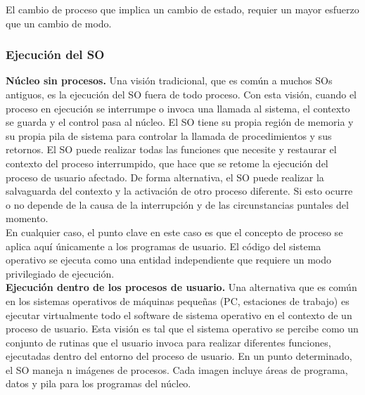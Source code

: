 \documentclass{article}
\begin{document}
				El cambio de proceso que implica un cambio de estado, requier un mayor esfuerzo que un cambio de modo.
				
			\subsubsection{Ejecución del SO}
				\textbf{Núcleo sin procesos.} Una visión tradicional, que es común a muchos SOs antiguos, es la ejecución del SO fuera de todo proceso. Con esta visión, cuando el proceso en ejecución se interrumpe o invoca una llamada al sistema, el contexto se guarda y el control pasa al núcleo. El SO tiene su propia región de memoria y su propia pila de sistema para controlar la llamada de procedimientos y sus retornos. El SO puede realizar todas las funciones que necesite y restaurar el contexto del proceso interrumpido, que hace que se retome la ejecución del proceso de usuario afectado. De forma alternativa, el SO puede realizar la salvaguarda del contexto y la activación de otro proceso diferente. Si esto ocurre o no depende de la causa de la interrupción y de las circunstancias puntales del momento. \\
				
				En cualquier caso, el punto clave en este caso es que el concepto de proceso se aplica aquí únicamente a los programas de usuario. El código del sistema operativo se ejecuta como una entidad independiente que requiere un modo privilegiado de ejecución. \\
				
				\textbf{Ejecución dentro de los procesos de usuario.} Una alternativa que es común en los sistemas operativos de máquinas pequeñas (PC, estaciones de trabajo) es ejecutar virtualmente todo el software de sistema operativo en el contexto de un proceso de usuario. Esta visión es tal que el sistema operativo se percibe como un conjunto de rutinas que el usuario invoca para realizar diferentes funciones, ejecutadas dentro del entorno del proceso de usuario. En un punto determinado, el SO maneja n imágenes de procesos. Cada imagen incluye áreas de programa, datos y pila para los programas del núcleo. \\
				
\end{document}
